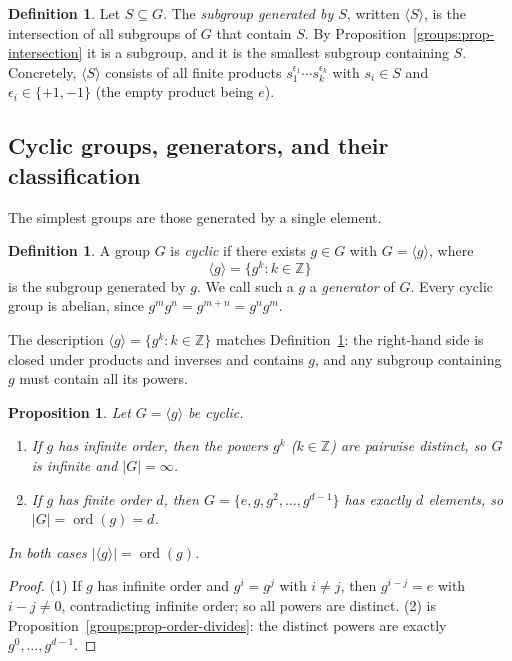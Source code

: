 \documentclass[11pt,a4paper]{article}
\newtheorem{proposition}[theorem]{Proposition}
\theoremstyle{definition}
\newtheorem{definition}[theorem]{Definition}
\theoremstyle{remark}
\newcommand{\Z}{\ensuremath{\mathbb{Z}}}
\DeclareMathOperator{\ord}{ord}
\begin{document}
\begin{definition}\label{groups:def-generated}
Let \(S \subseteq G\). The \emph{subgroup generated by \(S\)}, written \(\langle S \rangle\), is the intersection of all subgroups of \(G\) that contain \(S\). By Proposition~\ref{groups:prop-intersection} it is a subgroup, and it is the smallest subgroup containing \(S\). Concretely, \(\langle S \rangle\) consists of all finite products \(s_1^{\epsilon_1} \cdots s_k^{\epsilon_k}\) with \(s_i \in S\) and \(\epsilon_i \in \{+1,-1\}\) (the empty product being \(e\)).
\end{definition}

\subsection{Cyclic groups, generators, and their classification}

The simplest groups are those generated by a single element.

\begin{definition}\label{groups:def-cyclic}
A group \(G\) is \emph{cyclic} if there exists \(g \in G\) with \(G = \langle g \rangle\), where
\[
\langle g \rangle = \{ g^k : k \in \Z \}
\]
is the subgroup generated by \(g\). We call such a \(g\) a \emph{generator} of \(G\). Every cyclic group is abelian, since \(g^m g^n = g^{m+n} = g^n g^m\).
\end{definition}

The description \(\langle g \rangle = \{g^k : k \in \Z\}\) matches Definition~\ref{groups:def-generated}: the right-hand side is closed under products and inverses and contains \(g\), and any subgroup containing \(g\) must contain all its powers.

\begin{proposition}\label{groups:prop-cyclic-order}
Let \(G = \langle g \rangle\) be cyclic.
\begin{enumerate}
\item If \(g\) has infinite order, then the powers \(g^k\) (\(k \in \Z\)) are pairwise distinct, so \(G\) is infinite and \(|G| = \infty\).
\item If \(g\) has finite order \(d\), then \(G = \{e, g, g^2, \dots, g^{d-1}\}\) has exactly \(d\) elements, so \(|G| = \ord(g) = d\).
\end{enumerate}
In both cases \(|\langle g \rangle| = \ord(g)\).
\end{proposition}

\begin{proof}
(1) If \(g\) has infinite order and \(g^i = g^j\) with \(i \neq j\), then \(g^{i-j} = e\) with \(i - j \neq 0\), contradicting infinite order; so all powers are distinct. (2) is Proposition~\ref{groups:prop-order-divides}: the distinct powers are exactly \(g^0,\dots,g^{d-1}\).
\end{proof}
\end{document}
